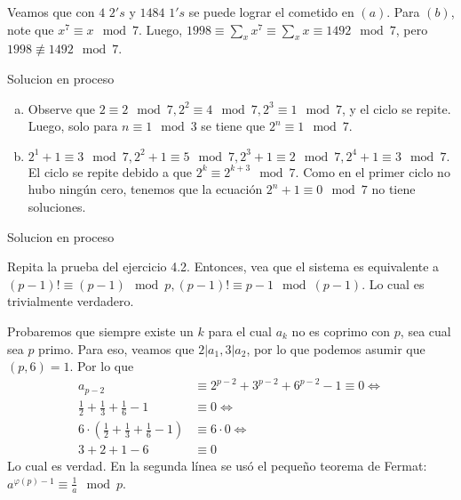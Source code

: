 \begin{sol}
	Veamos que con $4$ $2's$ y $1484$ $1's$ se puede lograr el cometido en $(a)$. Para $(b)$, note que $x^{7} \equiv x \mod 7$. Luego, $1998 \equiv \sum_{x} x^{7} \equiv \sum_{x} x \equiv 1492 \mod 7$, pero $1998 \not\equiv 1492 \mod 7$.
\end{sol}

\begin{sol}
	Solucion en proceso
\end{sol}

\begin{sol}
	\begin{enumerate}[a.]
		\item Observe que $2 \equiv 2 \mod 7, 2^2 \equiv 4 \mod 7, 2^3 \equiv 1 \mod 7$, y el ciclo se repite. Luego, solo para $n \equiv 1 \mod 3 $ se tiene que $2^n \equiv 1 \mod 7$.
		\item$ 2^1 +1 \equiv 3 \mod 7, 2^2+1 \equiv 5 \mod 7, 2^3 +1 \equiv 2 \mod 7, 2^4+1 \equiv 3 \mod 7. $ El ciclo se repite debido a que $2^k \equiv 2^{k+3} \mod 7$. Como en el primer ciclo no hubo ning\'un cero, tenemos que la ecuaci\'on $2^n +1 \equiv 0 \mod 7 $ no tiene soluciones.
	\end{enumerate}
\end{sol}

\begin{sol}
	Solucion en proceso
\end{sol}

\begin{sol}
	Repita la prueba del ejercicio 4.2. Entonces, vea que el sistema es equivalente a $(p-1)! \equiv (p-1) \mod p, (p-1)! \equiv p-1 \mod (p-1)$. Lo cual es trivialmente verdadero.
\end{sol}

\begin{sol}
	Probaremos que siempre existe un $k$ para el cual $a_{k}$ no es coprimo con $p$, sea cual sea $p$ primo. Para eso, veamos que $2|a_{1}, 3|a_{2}$, por lo que podemos asumir que $(p, 6) = 1$. Por lo que 
	\begin{align}
	a_{p-2} &\equiv 2^{p-2} + 3^{p-2} + 6^{p-2} -1 \equiv 0 \iff \\
	\frac{1}{2}+\frac{1}{3}+\frac{1}{6}-1 &\equiv 0 \iff \\
	6 \cdot ( \frac{1}{2}+\frac{1}{3}+\frac{1}{6}-1) &\equiv 6 \cdot 0 \iff \\
	3 + 2 + 1 - 6 &\equiv 0
	\end{align}
	Lo cual es verdad. En la segunda l\'inea se us\'o el pequeño teorema de Fermat: $a^{\varphi(p)-1} \equiv \frac{1}{a} \mod p$.
\end{sol}



